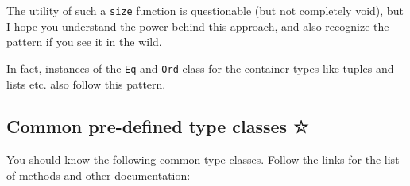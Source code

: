 \documentclass[11pt,
  american,
  DIV13]{article}
\begin{document}
The utility of such a \texttt{size} function is questionable (but not
completely void), but I hope you understand the power behind this
approach, and also recognize the pattern if you see it in the wild.

In fact, instances of the \texttt{Eq} and \texttt{Ord} class for the
container types like tuples and lists etc. also follow this pattern.

\hypertarget{common-pre-defined-type-classes}{%
\subsection{Common pre-defined type classes
☆}\label{common-pre-defined-type-classes}}

You should know the following common type classes. Follow the links for
the list of methods and other documentation:
\end{document}
